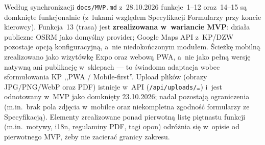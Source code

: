 \documentclass{sprz}
\begin{document}
Według synchronizacji \texttt{docs/\allowbreak MVP.md} z~28.10.2026 funkcje~1--12 oraz~14--15 są domknięte funkcjonalnie (z~lukami względem Specyfikacji Formularzy przy koncie kierowcy). Funkcja~13 (trasa) jest \textbf{zrealizowana w~wariancie MVP}: działa publiczne OSRM jako domyślny provider; Google Maps API z~KP/DZW pozostaje opcją konfiguracyjną, a~nie niedokończonym modułem. Ścieżkę mobilną zrealizowano jako wizytówkę Expo oraz webową PWA, a~nie jako pełną wersję natywną ani publikację w~sklepach --- to świadoma adaptacja wobec sformułowania KP ,,PWA / Mobile-first''. Upload plików (obrazy JPG/PNG/WebP oraz PDF) istnieje w~API (\texttt{/api/\allowbreak uploads/\ldots}) i~jest odnotowany w~MVP jako domknięty 23.10.2026; nadal pozostają ograniczenia (m.in.\ brak pola zdjęcia w~mobilce oraz niekompletna zgodność formularzy ze Specyfikacją). Elementy zrealizowane ponad pierwotną listę piętnastu funkcji (m.in.\ motywy, i18n, regulaminy PDF, tagi opon) odróżnia się w~opisie od pierwotnego MVP, żeby nie zacierać granicy zakresu.
\end{document}
